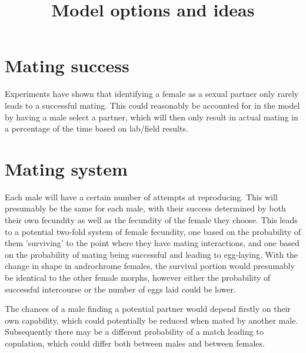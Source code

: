 \documentclass{article}
\title{Model options and ideas}
\date{\vspace{-5ex}}
\begin{document}
\maketitle

\section{Mating success}
Experiments have shown that identifying a female as a sexual partner only rarely leads to a successful mating. This could reasonably be accounted for in the model by having a male select a partner, which will then only result in actual mating in a percentage of the time based on lab/field results.

\section{Mating system}
Each male will have a certain number of attempts at reproducing. This will presumably be the same for each male, with their success determined by both their own fecundity as well as the fecundity of the female they choose. This leads to a potential two-fold system of female fecundity, one based on the probability of them 'surviving' to the point where they have mating interactions, and one based on the probability of mating being successful and leading to egg-laying. With the change in shape in androchrome females, the survival portion would presumably be identical to the other female morphs, however either the probability of successful intercourse or the number of eggs laid could be lower.

The chances of a male finding a potential partner would depend firstly on their own capability, which could potentially be reduced when mated by another male. Subsequently there may be a different probability of a match leading to copulation, which could differ both between males and between females.
\end{document}
